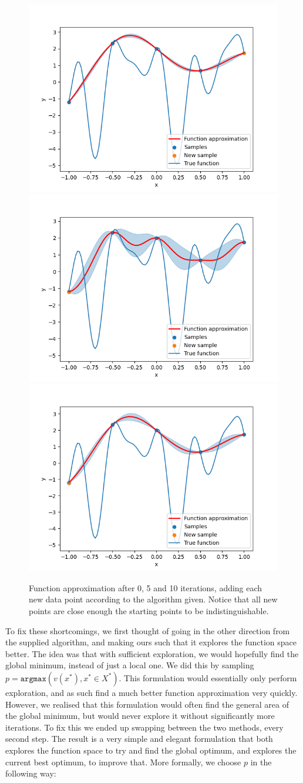 \begin{figure}[h]
\centering
\includegraphics[width=0.3\linewidth]{images/bayesian_optimization_0.png}
\includegraphics[width=0.3\linewidth]{images/bayesian_optimization_4.png}
\includegraphics[width=0.3\linewidth]{images/bayesian_optimization_9.png}
\setlength{\belowcaptionskip}{-10pt}
\caption{Function approximation after 0, 5 and 10 iterations, adding each new data point according to the algorithm given. Notice that all new points are close enough the starting points to be indistinguishable.}
\label{fig:iter_naive}
\end{figure}

To fix these shortcomings, we first thought of going in the other direction from the supplied algorithm, and making ours such that it explores the function space better. The idea was that with sufficient exploration, we would hopefully find the global minimum, instead of just a local one. We did this by sampling $p = \texttt{argmax} \left( v(x^*), x^* \in X^*\right)$. This formulation would essentially only perform exploration, and as such find a much better function approximation very quickly. However, we realised that this formulation would often find the general area of the global minimum, but would never explore it without significantly more iterations. To fix this we ended up swapping between the two methods, every second step. The result is a very simple and elegant formulation that both explores the function space to try and find the global optimum, and explores the current best optimum, to improve that. More formally, we choose $p$ in the following way:

